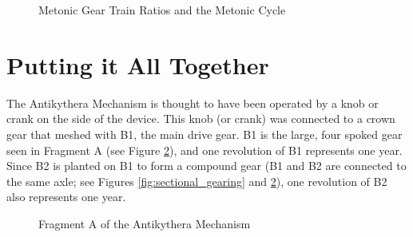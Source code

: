 \documentclass[11pt, oneside]{article}   	%
\theoremstyle{definition}
\begin{document}
\bigskip
\begin{figure}[H]
\caption{Metonic Gear Train Ratios and the Metonic Cycle}
\label{fig:metonic_gear_ratios}
\end{figure}


\bigskip
\section{Putting it All Together}
The Antikythera Mechanism is thought to have been operated by a knob or crank on the side of the device. This knob (or crank) was connected
to a crown gear that meshed with B1, the main drive gear. B1 is the large, four spoked gear seen in Fragment A (see Figure \ref{fig:fragmentA}), 
and one revolution of B1 represents one year. Since B2 is planted on B1 to form a compound gear (B1 and B2 are connected to the same axle;
see Figures  \ref{fig:sectional_gearing} and \ref{fig:fragmentA}), one revolution of B2 also represents one year. 


\bigskip
\begin{figure}[H]
\caption{Fragment A of the Antikythera Mechanism \cite{wiki:fragmentA}}
\label{fig:fragmentA}
\end{figure}
\end{document}
